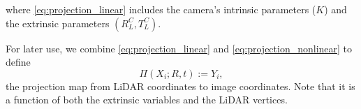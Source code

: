 where \eqref{eq:projection_linear} includes the camera's intrinsic parameters ($K$) and the
extrinsic parameters $(R_L^C, T_L^C)$.

For later use, we combine \eqref{eq:projection_linear} and \eqref{eq:projection_nonlinear} to define
\begin{equation}
\label{eq:Projection}
\Pi\left(X_i; R, t \right):=Y_i,
\end{equation}
the projection map from LiDAR coordinates to image coordinates. Note that it is
a function of both the extrinsic variables and the LiDAR vertices.

